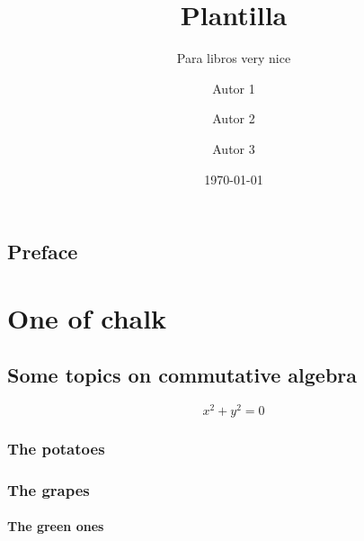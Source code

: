 \documentclass[draft]{qx-files/qx-book}
\title{Plantilla}
\author{Autor 1 \and Autor 2 \and Autor 3}
\date{\today}
\subtitle{Para libros very nice}
\begin{document}
\MakeBookCover

\frontmatter


\maketitle





\chapter{Preface}

\lipsum[1]




\tableofcontents

\mainmatter

\part{One of chalk}


\chapter[Álgebra conmutativa]{Some topics on commutative algebra}
\lipsum[2]
\begin{equation}
  x^2 + y^2 = 0
\end{equation}



\lipsum[1]


\lipsum[1]





\lipsum[1]



\section{The potatoes}

\lipsum[1-2]



\lipsum[1]

\ExerciseSection

\section{The grapes}

\lipsum[1]

\subsection{The green ones}
\end{document}
